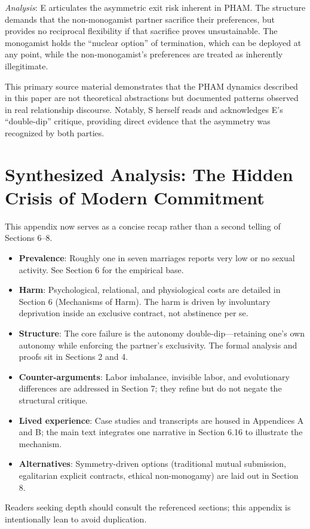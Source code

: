 \documentclass[12pt,openany]{book}
\numberwithin{equation}{chapter}
\begin{document}
\textit{Analysis}: E articulates the asymmetric exit risk inherent in PHAM. The structure demands that the non-monogamist partner sacrifice their preferences, but provides no reciprocal flexibility if that sacrifice proves unsustainable. The monogamist holds the ``nuclear option'' of termination, which can be deployed at any point, while the non-monogamist's preferences are treated as inherently illegitimate.

This primary source material demonstrates that the PHAM dynamics described in this paper are not theoretical abstractions but documented patterns observed in real relationship discourse. Notably, S herself reads and acknowledges E's ``double-dip'' critique, providing direct evidence that the asymmetry was recognized by both parties.

\newpage
\chapter{Synthesized Analysis: The Hidden Crisis of Modern Commitment}

This appendix now serves as a concise recap rather than a second telling of Sections 6--8.

\begin{itemize}
    \item \textbf{Prevalence}: Roughly one in seven marriages reports very low or no sexual activity. See Section 6 for the empirical base.
    \item \textbf{Harm}: Psychological, relational, and physiological costs are detailed in Section 6 (Mechanisms of Harm). The harm is driven by involuntary deprivation inside an exclusive contract, not abstinence per se.
    \item \textbf{Structure}: The core failure is the autonomy double-dip---retaining one's own autonomy while enforcing the partner's exclusivity. The formal analysis and proofs sit in Sections 2 and 4.
    \item \textbf{Counter-arguments}: Labor imbalance, invisible labor, and evolutionary differences are addressed in Section 7; they refine but do not negate the structural critique.
    \item \textbf{Lived experience}: Case studies and transcripts are housed in Appendices A and B; the main text integrates one narrative in Section 6.16 to illustrate the mechanism.
    \item \textbf{Alternatives}: Symmetry-driven options (traditional mutual submission, egalitarian explicit contracts, ethical non-monogamy) are laid out in Section 8.
\end{itemize}

Readers seeking depth should consult the referenced sections; this appendix is intentionally lean to avoid duplication.
\end{document}
